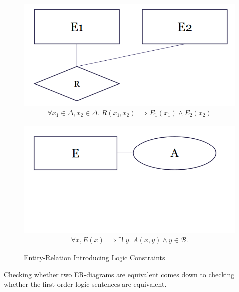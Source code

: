 \begin{figure}[H]
\begin{minipage}[t]{.5\textwidth}
\centering
\includegraphics[width=\textwidth]{images/diagram_logic.PNG}
\label{diagram_logic}
\begin{align*}
\forall x_1 \in \Delta, x_2 \in \Delta.\; R(x_1, x_2) \implies E_1(x_1) \land E_2(x_2)
\end{align*}
\end{minipage}
\begin{minipage}[t]{.5\textwidth}
\centering
\includegraphics[width=\textwidth]{images/entity_logic.PNG}
\label{entity_logic}
\begin{align*}
\forall x, E(x)\implies \exists !\;y.\;A(x,y) \land y \in \mathcal{B}.
\end{align*}
\end{minipage}
\caption{Entity-Relation Introducing Logic Constraints}
\end{figure}
Checking whether two ER-diagrams are equivalent comes down to checking whether the first-order logic sentences are equivalent.

